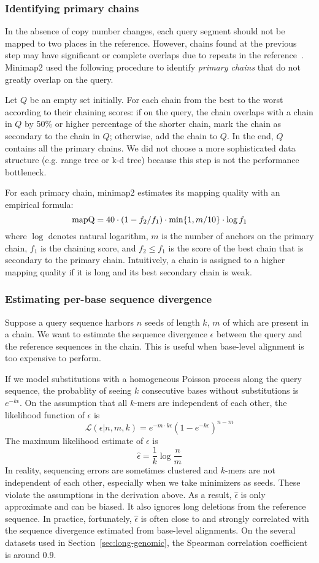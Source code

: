 \documentclass{bioinfo}
\begin{document}
\begin{methods}
\subsubsection{Identifying primary chains}\label{sec:primary}
In the absence of copy number changes, each query segment should not be mapped
to two places in the reference. However, chains found at the previous step may
have significant or complete overlaps due to repeats in the reference~\citep{Li:2010fk}.
Minimap2 used the following procedure to identify \emph{primary chains} that do
not greatly overlap on the query.

Let $Q$ be an empty set initially. For each
chain from the best to the worst according to their chaining scores: if on the
query, the chain overlaps with a chain in $Q$ by 50\% or higher percentage of
the shorter chain, mark the chain as secondary to the chain in $Q$; otherwise,
add the chain to $Q$. In the end, $Q$ contains all the primary chains. We did
not choose a more sophisticated data structure (e.g. range tree or k-d tree)
because this step is not the performance bottleneck.

For each primary chain, minimap2 estimates its mapping quality with an
empirical formula:
\[
{\rm mapQ}=40\cdot (1-f_2/f_1)\cdot\min\{1,m/10\}\cdot\log f_1
\]
where $\log$ denotes natural logarithm, $m$ is the number of anchors on the primary chain, $f_1$ is the chaining
score, and $f_2\le f_1$ is the score of the best chain that is secondary to the
primary chain. Intuitively, a chain is assigned to a higher mapping quality if
it is long and its best secondary chain is weak.

\subsubsection{Estimating per-base sequence divergence}
Suppose a query sequence harbors $n$ seeds of length $k$, $m$ of which are
present in a chain. We want to estimate the sequence divergence $\epsilon$
between the query and the reference sequences in the chain. This is useful
when base-level alignment is too expensive to perform.

If we model substitutions with a homogeneous Poisson process along the query
sequence, the probablity of seeing $k$ consecutive bases without substitutions
is $e^{-k\epsilon}$. On the assumption that all $k$-mers are independent of
each other, the likelihood function of $\epsilon$ is
\[
\mathcal{L}(\epsilon|n,m,k)=e^{-m\cdot k\epsilon}(1-e^{-k\epsilon})^{n-m}
\]
The maximum likelihood estimate of $\epsilon$ is
\[
\hat{\epsilon}=\frac{1}{k}\log\frac{n}{m}
\]
In reality, sequencing errors are sometimes clustered and $k$-mers are not
independent of each other, especially when we take minimizers as seeds. These
violate the assumptions in the derivation above. As a result, $\hat{\epsilon}$
is only approximate and can be biased. It also ignores long deletions from the
reference sequence. In practice, fortunately, $\hat{\epsilon}$ is often close
to and strongly correlated with the sequence divergence estimated from
base-level alignments. On the several datasets used in
Section~\ref{sec:long-genomic}, the Spearman correlation coefficient is around
$0.9$.


\end{methods}
\end{document}
